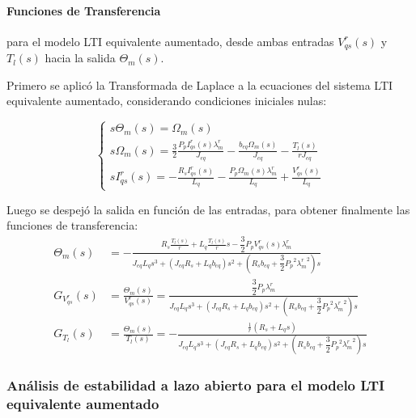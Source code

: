 \documentclass[a4paper, 10pt, onecolumn,journal]{ieeeconf}
\begin{document}
\paragraph{\textbf{Funciones de Transferencia}}
para el modelo LTI equivalente aumentado, desde ambas entradas $V^r_{qs}(s)$ y $T_l(s)$ hacia la salida ${\Theta}_m(s)$.

Primero se aplicó la Transformada de Laplace a la ecuaciones del sistema LTI equivalente aumentado, considerando condiciones iniciales nulas:

\begin{equation}
	\begin{cases}
		s{\Theta}_m(s) = {\Omega}_m(s)\\
		s{\Omega}_m(s) = \frac{3}{2} \frac{P_p I^r_{qs}(s)\lambda^r_m}{J_{eq}} - \frac{b_{eq}\Omega_m(s)}{J_{eq}} - \frac{T_l(s)}{r J_{eq}}\\
		s{I}^r_{qs}(s) = -\frac{R_s I^r_{qs}(s)}{L_q} - \frac{P_p \Omega_m(s) \lambda^r_m}{L_q}+ \frac{V^r_{qs}(s)}{L_q}	
	\end{cases}
	\label{equaciones modelo LTI eq en s}
\end{equation}

Luego se despejó la salida en función de las entradas, para obtener finalmente las funciones de transferencia:
\begin{align}
	{\Theta}_m(s) &= -\frac{R_{s} \frac{T_l(s)}{r} + L_{q} \frac{T_l(s)}{r} s - \dfrac{3}{2} P_{p} V^r_{qs}(s) \lambda^r_m}{J_{eq} L_{q} s^3 +\left( J_{eq} R_{s} + L_{q} b_{eq} \right)s^2 + \left( R_{s} b_{eq} + \dfrac{3}{2} {P_{p}}^2 { \lambda^r_m}^2\right) s}\label{posicion en funcion de demas variables en laplace}\\
	G_{V^r_{qs}}(s) &= \frac{{\Theta}_m(s)}{V^r_{qs}(s)} = \frac{\dfrac{3}{2} P_{p} \lambda^r_m}{J_{eq} L_{q} s^3 +\left( J_{eq} R_{s} + L_{q} b_{eq} \right)s^2 + \left( R_{s} b_{eq} + \dfrac{3}{2} {P_{p}}^2 { \lambda^r_m}^2\right) s}\label{funcion de transferencia desde Vqs}\\
	G_{T_l}(s) &= \frac{{\Theta}_m(s)}{T_l(s)} = -\frac{\frac{1}{r}\left( R_{s} + L_{q} s\right) }{J_{eq} L_{q} s^3 +\left( J_{eq} R_{s} + L_{q} b_{eq} \right)s^2 + \left( R_{s} b_{eq} + \dfrac{3}{2} {P_{p}}^2 { \lambda^r_m}^2\right) s}
	\label{funcion de transferencia desde T_l}
\end{align}

\subsubsection{\textbf{Análisis de estabilidad a lazo abierto para el modelo LTI equivalente aumentado}}
\end{document}
